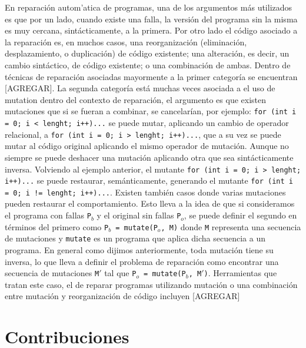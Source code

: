 En reparaci\'on autom'atica de programas, una de los argumentos m\'as utilizados es que por un lado, cuando existe una falla, la versi\'on del programa sin la misma es muy cercana, sint\'acticamente, a la primera. Por otro lado el c\'odigo asociado a la reparaci\'on es, en muchos casos, una reorganizaci\'on (eliminaci\'on, desplazamiento, o duplicaci\'on) de c\'odigo existente; una alteraci\'on, es decir, un cambio sint\'actico, de c\'odigo existente; o una combinaci\'on de ambas. Dentro de t\'ecnicas de reparaci\'on asociadas mayormente a la primer categor\'ia se encuentran [AGREGAR]. La segunda categor\'ia est\'a muchas veces asociada a el uso de mutation dentro del contexto de reparaci\'on, el argumento es que existen mutaciones que si se fueran a combinar, se cancelar\'ian, por ejemplo:
\lstinline|for (int i = 0; i < lenght; i++)...| se puede mutar, aplicando un cambio de operador relacional, a \lstinline|for (int i = 0; i > lenght; i++)...|, que a su vez se puede mutar al c\'odigo original aplicando el mismo operador de mutaci\'on. Aunque no siempre se puede deshacer una mutaci\'on aplicando otra que sea sint\'acticamente inversa. Volviendo al ejemplo anterior, el mutante \lstinline|for (int i = 0; i > lenght; i++)...| se puede restaurar, sem\'anticamente, generando el mutante \lstinline|for (int i = 0; i != lenght; i++)...|. Existen tambi\'en casos donde varias mutaciones pueden restaurar el comportamiento. Esto lleva a la idea de que si consideramos el programa con fallas \texttt{P$_b$} y el original sin fallas \texttt{P$_o$}, se puede definir el segundo en t\'erminos del primero como \texttt{P$_b$ = mutate(P$_o$, M)} donde \texttt{M} representa una secuencia de mutaciones y \texttt{mutate} es un programa que aplica dicha secuencia a un programa. En general como dijimos anteriormente, toda mutaci\'on tiene su inversa, lo que lleva a definir el problema de reparaci\'on como encontrar una secuencia de mutaciones \texttt{M$\prime$} tal que \texttt{P$_o$ = mutate(P$_b$, M$\prime$)}. Herramientas que tratan este caso, el de reparar programas utilizando mutaci\'on o una combinaci\'on entre mutaci\'on y reorganizaci\'on de c\'odigo incluyen [AGREGAR]

\section{Contribuciones}
\label{sec:intro.contribuciones}

